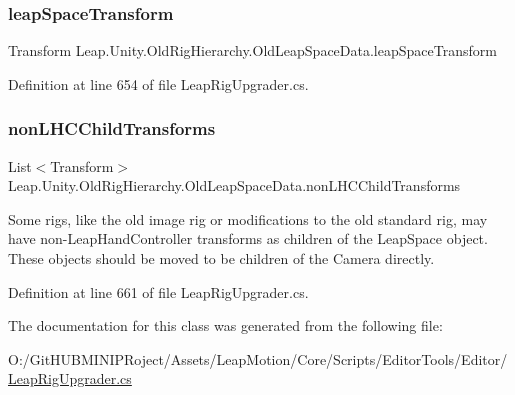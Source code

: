 \subsubsection{\texorpdfstring{leapSpaceTransform}{leapSpaceTransform}}
{\footnotesize\ttfamily Transform Leap.\+Unity.\+Old\+Rig\+Hierarchy.\+Old\+Leap\+Space\+Data.\+leap\+Space\+Transform}



Definition at line 654 of file Leap\+Rig\+Upgrader.\+cs.

\mbox{\label{class_leap_1_1_unity_1_1_old_rig_hierarchy_1_1_old_leap_space_data_ad44581a340d64a0e51b2cf26718b034b}} 
\subsubsection{\texorpdfstring{nonLHCChildTransforms}{nonLHCChildTransforms}}
{\footnotesize\ttfamily List$<$Transform$>$ Leap.\+Unity.\+Old\+Rig\+Hierarchy.\+Old\+Leap\+Space\+Data.\+non\+L\+H\+C\+Child\+Transforms}



Some rigs, like the old image rig or modifications to the old standard rig, may have non-\/\+Leap\+Hand\+Controller transforms as children of the Leap\+Space object. These objects should be moved to be children of the Camera directly. 



Definition at line 661 of file Leap\+Rig\+Upgrader.\+cs.



The documentation for this class was generated from the following file\+:\begin{DoxyCompactItemize}
\item 
O\+:/\+Git\+H\+U\+B\+M\+I\+N\+I\+P\+Roject/\+Assets/\+Leap\+Motion/\+Core/\+Scripts/\+Editor\+Tools/\+Editor/\mbox{\hyperlink{_leap_rig_upgrader_8cs}{Leap\+Rig\+Upgrader.\+cs}}\end{DoxyCompactItemize}
